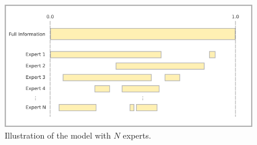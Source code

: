 \documentclass[11pt,twoside]{article}
\begin{document}
\begin{figure}[htbp]
   \includegraphics[width = \textwidth]{N=N} %
   \caption{Illustration of the model with $N$ experts.}
   \label{diagramN}
\end{figure}
\end{document}
